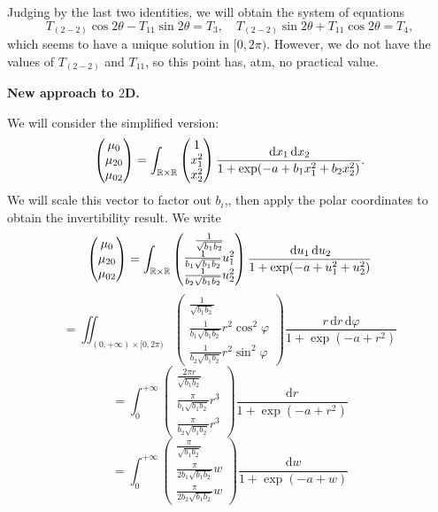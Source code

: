 \documentclass{article}
\begin{document}
Judging by the last two identities, we will obtain the system of equations
\[
	T_{(2-2)}\cos2\theta-T_{11}\sin2\theta=T_3,\quad T_{(2-2)}\sin2\theta+T_{11}\cos2\theta=T_4,
\]
which seems to have a unique solution in $[0,2\pi)$. However, we do not have the values of $T_{(2-2)}$ and $T_{11}$, so this point has, atm, no practical value.



\textbf{New approach to $2$D.}

We will consider the simplified version:
\[
	\begin{pmatrix}
		\mu_0\\
		\mu_{20}\\
		\mu_{02}
	\end{pmatrix}
	=
	\int_{{\mathbb R}\times{\mathbb R}}^{}\begin{pmatrix}
		1\\
		x_1^2\\
		x_2^2
	\end{pmatrix}
	\frac{{\,\mathrm{d} x}_1{\,\mathrm{d} x}_2}{1+\exp(-a+b_1x_1^2+b_2x_2^2)}.
\]
We will scale this vector to factor out $b_i$,, then apply the polar coordinates to obtain the invertibility result.
We write
\[
	\begin{pmatrix}
		\mu_0\\
		\mu_{20}\\
		\mu_{02}
	\end{pmatrix}
	=
	\int_{{\mathbb R}\times{\mathbb R}}^{}\begin{pmatrix}
		\frac{1}{\sqrt{b_1b_2}}\\
		\frac{1}{b_1\sqrt{b_1b_2}}u_1^2\\
		\frac{1}{b_2\sqrt{b_1b_2}}u_2^2
	\end{pmatrix}
	\frac{{\,\mathrm du}_1{\,\mathrm du}_2}{1+\exp(-a+u_1^2+u_2^2)}
\]
\[
=
\iint_{(0,+\infty)\times[0,2\pi)}\begin{pmatrix}
		\frac{1}{\sqrt{b_1b_2}}\\
		\frac{1}{b_1\sqrt{b_1b_2}}r^2\cos^2\varphi\\
		\frac{1}{b_2\sqrt{b_1b_2}}r^2\sin^2\varphi
	\end{pmatrix}
	\frac{r\,\mathrm dr\,\mathrm d\varphi}{1+\exp(-a+r^2)}
\]
\[
=
\int_{0}^{+\infty}\begin{pmatrix}
		\frac{2\pi r}{\sqrt{b_1b_2}}\\
		\frac{\pi}{b_1\sqrt{b_1b_2}}r^3\\
		\frac{\pi}{b_2\sqrt{b_1b_2}}r^3
	\end{pmatrix}
	\frac{\mathrm dr}{1+\exp(-a+r^2)}
\]
\[
=
\int_{0}^{+\infty}\begin{pmatrix}
		\frac{\pi }{\sqrt{b_1b_2}}\\
		\frac{\pi}{2b_1\sqrt{b_1b_2}}w\\
		\frac{\pi}{2b_2\sqrt{b_1b_2}}w
	\end{pmatrix}
	\frac{\mathrm dw}{1+\exp(-a+w)}
\]
\end{document}
